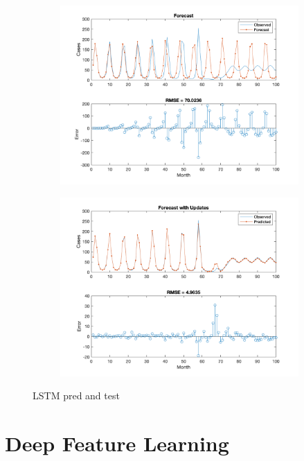 \documentclass[11pt,conference,compsoc]{IEEEtran}
\begin{document}
\begin{figure}[]
    \centering
    \begin{subfigure}{0.4\linewidth}
    \includegraphics[width=\linewidth]{images/lstm_Ypred.png}
    \end{subfigure}
    \begin{subfigure}{0.4\linewidth}
    \includegraphics[width=\linewidth]{images/lstm_XTest.png}
    \end{subfigure}
    \caption{LSTM pred and test}
    \label{fig:9}
\end{figure}

\section{Deep Feature Learning}
\end{document}
